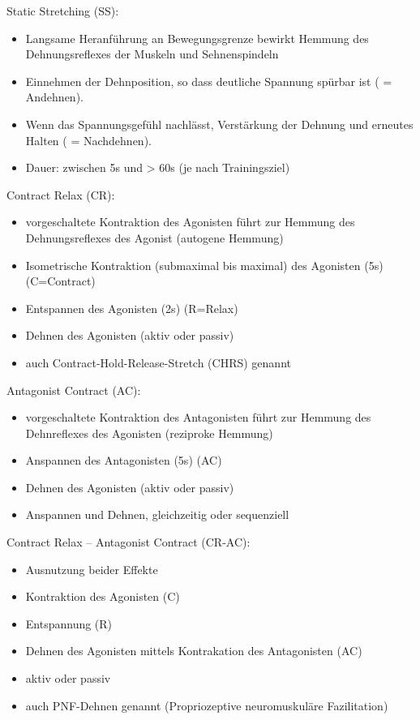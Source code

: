 Static Stretching (SS):
\begin{itemize}
    \item Langsame Heranführung an Bewegungsgrenze bewirkt Hemmung des Dehnungsreflexes der Muskeln und Sehnenspindeln
    \item Einnehmen der Dehnposition, so dass deutliche
    Spannung spürbar ist ( = Andehnen).
    \item Wenn das Spannungsgefühl nachlässt, Verstärkung der Dehnung und erneutes Halten ( = Nachdehnen).
    \item Dauer: zwischen 5s und > 60s (je nach Trainingsziel)
\end{itemize}

Contract Relax (CR):
\begin{itemize}
    \item vorgeschaltete Kontraktion des Agonisten führt zur Hemmung des Dehnungsreflexes des Agonist (autogene Hemmung)
    \item Isometrische Kontraktion (submaximal bis maximal) des Agonisten (5s) (C=Contract)
    \item Entspannen des Agonisten (2s) (R=Relax)
    \item Dehnen des Agonisten (aktiv oder passiv)
    \item auch Contract-Hold-Release-Stretch (CHRS) genannt
\end{itemize}

Antagonist Contract (AC):
\begin{itemize}
    \item vorgeschaltete Kontraktion des Antagonisten führt zur Hemmung des Dehnreflexes des Agonisten (reziproke Hemmung)
    \item Anspannen des Antagonisten (5s) (AC)
    \item Dehnen des Agonisten (aktiv oder passiv)
    \item Anspannen und Dehnen, gleichzeitig oder sequenziell
\end{itemize}

Contract Relax – Antagonist Contract (CR-AC):
\begin{itemize}
    \item Ausnutzung beider Effekte
    \item Kontraktion des Agonisten (C)
    \item Entspannung (R)
    \item Dehnen des Agonisten mittels Kontrakation des Antagonisten (AC)
    \item aktiv oder passiv
    \item auch PNF-Dehnen genannt (Propriozeptive neuromuskuläre Fazilitation)
\end{itemize}

